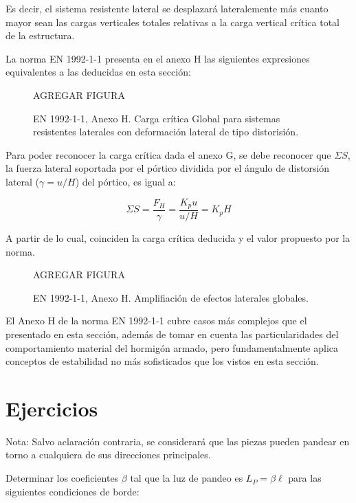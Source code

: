 Es decir, el sistema resistente lateral se desplazará lateralemente más cuanto mayor sean las cargas verticales totales relativas a la carga vertical crítica total de la estructura.

La norma EN 1992-1-1 presenta en el anexo H las siguientes expresiones equivalentes a las deducidas en esta sección:

\begin{figure}[htb]
	\centering
	AGREGAR FIGURA
	\caption{EN 1992-1-1, Anexo H. Carga crítica Global para sistemas resistentes laterales con deformación lateral de tipo distorisión.}
	\label{fig:EN_Pcrit}
\end{figure}

Para poder reconocer la carga crítica dada el anexo G, se debe reconocer que $\Sigma S$, la fuerza lateral soportada por el pórtico dividida por el ángulo de distorsión lateral ($\gamma = u / H$) del pórtico, es igual a:

$$ \Sigma S = \frac{F_H}{\gamma} = \frac{K_p u}{u/H} = K_p H  $$

A partir de lo cual, coinciden la carga crítica deducida y el valor propuesto por la norma. 

\begin{figure}[htb]
	\centering
	AGREGAR FIGURA
	\caption{EN 1992-1-1, Anexo H. Amplifiación de efectos laterales globales.}
\label{fig:EN_Pcrit}
\end{figure}

El Anexo H de la norma EN 1992-1-1 cubre casos más complejos que el presentado en esta sección, además de tomar en cuenta las particularidades del comportamiento material del hormigón armado, pero fundamentalmente aplica conceptos de estabilidad no más sofisticados que los vistos en esta sección.



\section{Ejercicios}
\setcounter{ejercicio}{0}

Nota: Salvo aclaración contraria, se considerará que las piezas pueden pandear en torno a cualquiera de sus direcciones principales.

\ejercicio 

Determinar los coeficientes $\beta$ tal que la luz de pandeo es $L_P=\beta\ell$ para las siguientes condiciones de borde:

